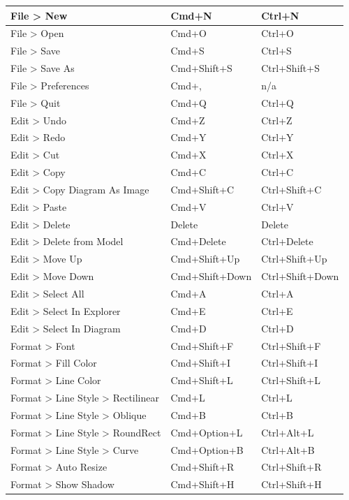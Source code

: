 \documentclass[a4paper,12pt]{extreport}
\begin{document}
\begin{longtable}{|l|l|l|}
			File > New & Cmd+N & Ctrl+N  \\\hline
			File > Open & Cmd+O & Ctrl+O \\ \hline
			File > Save & Cmd+S & Ctrl+S \\ \hline
			File > Save As & Cmd+Shift+S & Ctrl+Shift+S \\ \hline
			File > Preferences & Cmd+, & n/a \\ \hline
			File > Quit & Cmd+Q & Ctrl+Q \\ \hline
			Edit > Undo & Cmd+Z & Ctrl+Z \\ \hline
			Edit > Redo & Cmd+Y & Ctrl+Y \\ \hline
			Edit > Cut & Cmd+X & Ctrl+X \\ \hline
			Edit > Copy & Cmd+C & Ctrl+C \\ \hline
			Edit > Copy Diagram As Image & Cmd+Shift+C & Ctrl+Shift+C \\ \hline
			Edit > Paste & Cmd+V & Ctrl+V \\ \hline
			Edit > Delete & Delete & Delete \\ \hline
			Edit > Delete from Model & Cmd+Delete & Ctrl+Delete \\ \hline
			Edit > Move Up & Cmd+Shift+Up & Ctrl+Shift+Up \\ \hline
			Edit > Move Down & Cmd+Shift+Down & Ctrl+Shift+Down \\ \hline
			Edit > Select All & Cmd+A & Ctrl+A \\ \hline
			Edit > Select In Explorer & Cmd+E & Ctrl+E \\ \hline
			Edit > Select In Diagram & Cmd+D & Ctrl+D \\ \hline
			Format > Font & Cmd+Shift+F & Ctrl+Shift+F \\ \hline
			Format > Fill Color & Cmd+Shift+I & Ctrl+Shift+I \\ \hline
			Format > Line Color & Cmd+Shift+L & Ctrl+Shift+L \\ \hline
			Format > Line Style > Rectilinear & Cmd+L & Ctrl+L \\ \hline
			Format > Line Style > Oblique & Cmd+B & Ctrl+B \\ \hline
			Format > Line Style > RoundRect & Cmd+Option+L & Ctrl+Alt+L \\ \hline
			Format > Line Style > Curve & Cmd+Option+B & Ctrl+Alt+B \\ \hline
			Format > Auto Resize & Cmd+Shift+R & Ctrl+Shift+R \\ \hline
			Format > Show Shadow & Cmd+Shift+H & Ctrl+Shift+H \\ \hline

\end{longtable}
\end{document}
